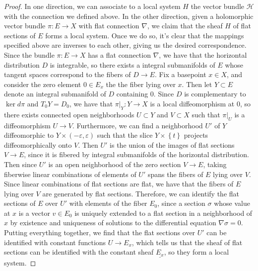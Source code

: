 \documentclass[psamsfonts, 12pt]{amsart}
\theoremstyle{definition}
\theoremstyle{remark}
\newcommand{\set}[1]{\left\lbrace #1 \right\rbrace}
\begin{document}
\begin{proof}
In one direction, we can associate to a local system $H$ the vector bundle
$\mathcal{H}$ with the connection we defined above. In the
other direction, given a holomorphic vector bundle $\pi : E \to X$ with flat connection
$\nabla$, we claim that the sheaf $H$ of flat sections of $E$ forms a local system.
Once we do so, it's clear that the mappings specified above are inverses to
each other, giving us the desired correspondence. \\

Since the bundle $\pi : E \to X$ has a flat connection $\nabla$, we have that the
horizontal distribution $D$ is integrable, so there exists a integral
submanifolds of $E$ whose tangent spaces correspond to the fibers of $D \to E$.
Fix a basepoint $x \in X$, and consider the zero element $0 \in E_x$ the the fiber
lying over $x$. Then let $Y \subset E$ denote an integral submanifold of $D$ containing
$0$. Since $D$ is complementary to $\ker d\pi$ and $T_0Y = D_0$, we have that
$\pi\vert_Y : Y \to X$ is a local diffeomorphism at $0$, so there exists connected
open neighborhoods $U \subset Y$ and $V \subset X$ such that $\pi\vert_U$ is a
diffeomorphism $U \to V$. Furthermore, we can find a neighborhood $U'$ of $Y$
diffeomorphic to $Y \times (-\varepsilon,\varepsilon)$ such that the slice
$Y \times \set{t}$ projects diffeomorphically onto $V$. Then $U'$ is the union of
the images of flat sections $V \to E$, since it is fibered by integral submanifolds
of the horizontal distribution. Then since $U'$ is an open neighborhood of the
zero section $V \to E$, taking fiberwise linear combinations of elements
of $U'$ spans the fibers of $E$ lying over $V$. Since linear combinations of flat
sections are flat, we have that the fibers of $E$ lying over $V$ are generated by flat
sections. Therefore, we can identify the flat sections of $E$ over $U'$ with elements
of the fiber $E_0$, since a section $\sigma$ whose value at $x$ is a vector
$v \in E_0$ is uniquely extended to a flat section in a neighborhood of $x$
by existence and uniqueness of solutions to the differential equation
$\nabla\sigma = 0$. Putting everything together, we find that the flat sections over
$U'$ can be identified with constant functions $U \to E_x$, which tells us that the
sheaf of flat sections can be identified with the constant sheaf $\underline{E_x}$,
so they form a local system.
\end{proof}
%
\end{document}
